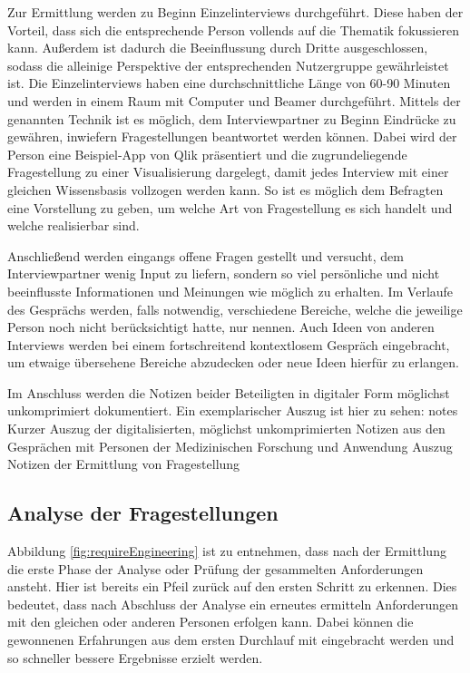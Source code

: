 Zur Ermittlung werden zu Beginn Einzelinterviews durchgeführt. 
Diese haben der Vorteil, dass sich die entsprechende Person vollends auf die Thematik fokussieren kann.
Außerdem ist dadurch die Beeinflussung durch Dritte ausgeschlossen, sodass die alleinige Perspektive der entsprechenden Nutzergruppe gewährleistet ist.
Die Einzelinterviews haben eine durchschnittliche Länge von 60-90 Minuten und werden in einem Raum mit Computer und Beamer durchgeführt.
Mittels der genannten Technik ist es möglich, dem Interviewpartner zu Beginn Eindrücke zu gewähren, inwiefern Fragestellungen beantwortet werden können.
Dabei wird der Person eine Beispiel-App von Qlik präsentiert und die zugrundeliegende Fragestellung zu einer Visualisierung dargelegt, damit jedes Interview mit einer gleichen Wissensbasis vollzogen werden kann.
So ist es möglich dem Befragten eine Vorstellung zu geben, um welche Art von Fragestellung es sich handelt und welche realisierbar sind.

Anschließend werden eingangs offene Fragen gestellt und versucht, dem Interviewpartner wenig Input zu liefern, sondern so viel persönliche und nicht beeinflusste Informationen und Meinungen wie möglich zu erhalten.
Im Verlaufe des Gesprächs werden, falls notwendig, verschiedene Bereiche, welche die jeweilige Person noch nicht berücksichtigt hatte, nur nennen.
Auch Ideen von anderen Interviews werden bei einem fortschreitend kontextlosem Gespräch eingebracht, um etwaige übersehene Bereiche abzudecken oder neue Ideen hierfür zu erlangen. 

Im Anschluss werden die Notizen beider Beteiligten in digitaler Form möglichst unkomprimiert dokumentiert.
Ein exemplarischer Auszug ist hier zu sehen: 
\bildbreit
{notes}
{Kurzer Auszug der digitalisierten, möglichst unkomprimierten Notizen aus den Gesprächen mit Personen der \glqq Medizinischen Forschung und Anwendung\grqq}
{Auszug Notizen der Ermittlung von Fragestellung}



\subsection{Analyse der Fragestellungen}
\label{sub:analyseFragen}
Abbildung \ref{fig:requireEngineering} ist zu entnehmen, dass nach der Ermittlung die erste Phase der Analyse oder Prüfung der gesammelten Anforderungen ansteht.
Hier ist bereits ein Pfeil zurück auf den ersten Schritt zu erkennen.
Dies bedeutet, dass nach Abschluss der Analyse ein erneutes ermitteln Anforderungen mit den gleichen oder anderen Personen erfolgen kann.
Dabei können die gewonnenen Erfahrungen aus dem ersten Durchlauf mit eingebracht werden und so schneller bessere Ergebnisse erzielt werden.

